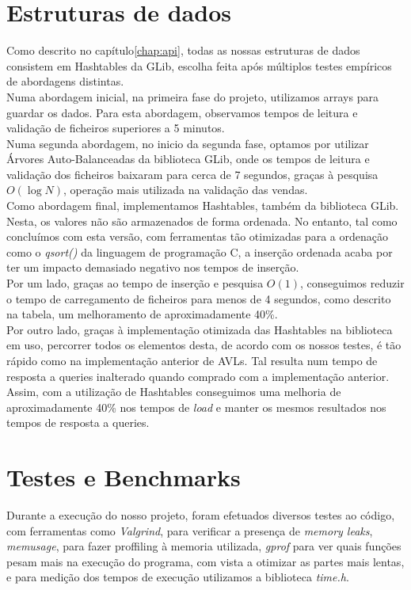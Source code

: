 \documentclass[a4paper]{report}
\begin{document}
\chapter{Estruturas de dados}

Como descrito no capítulo\ref{chap:api}, todas as nossas estruturas de dados consistem 
em Hashtables da GLib, escolha feita após múltiplos testes empíricos de abordagens distintas.\\
Numa abordagem inicial, na primeira fase do projeto, utilizamos arrays para 
guardar os dados. Para esta abordagem, observamos tempos de leitura e validação de ficheiros
superiores a 5 minutos.\\
Numa segunda abordagem, no inicio da segunda fase, optamos por utilizar 
Árvores Auto-Balanceadas da biblioteca GLib, onde os tempos de leitura e validação 
dos ficheiros baixaram para cerca de 7 segundos, graças à pesquisa $O(\log N)$,
operação mais utilizada na validação das vendas.\\
Como abordagem final, implementamos Hashtables, também da biblioteca GLib.
Nesta, os valores não são armazenados de forma ordenada. No entanto,
tal como concluímos com esta versão, com ferramentas tão otimizadas para a ordenação
como o \textit{qsort()} da linguagem de programação C, a inserção ordenada acaba por ter
um impacto demasiado negativo nos tempos de inserção.\\
Por um lado, graças ao tempo de inserção e pesquisa $O(1)$, conseguimos reduzir
o tempo de carregamento de ficheiros para menos de 4 segundos, como descrito
na tabela, um melhoramento de aproximadamente 40\%.\\
Por outro lado, graças à implementação otimizada das Hashtables na biblioteca em uso,
percorrer todos os elementos desta, de acordo com os nossos testes, é tão rápido como
na implementação anterior de AVLs. Tal resulta num tempo de resposta a queries
inalterado quando comprado com a implementação anterior.\\
Assim, com a utilização de Hashtables conseguimos uma melhoria de
aproximadamente 40\% nos tempos de \textit{load} e manter os mesmos resultados nos
tempos de resposta a queries.

\chapter{Testes e Benchmarks}

Durante a execução do nosso projeto, foram efetuados diversos testes ao código, com
ferramentas como \textit{Valgrind}, para verificar a presença de \textit{memory 
leaks}, \textit{memusage}, para fazer proffiling à memoria utilizada, \textit{gprof}
para ver quais funções pesam mais na execução do programa, com vista a otimizar as
partes mais lentas, e para medição dos tempos de execução utilizamos a biblioteca
\textit{time.h}.
\end{document}
